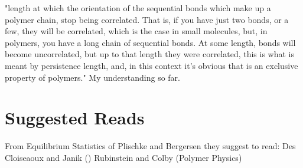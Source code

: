 "length at which the orientation of the sequential bonds which make up
a polymer chain, stop being correlated.  That is, if you have just two
bonds, or a  few, they will be correlated, which is  the case in small
molecules,  but, in  polymers, you  have  a long  chain of  sequential
bonds. At some length, bonds  will become uncorrelated, but up to that
length  they were  correlated, this  is what  is meant  by persistence
length,  and,  in this  context  it's  obvious  that is  an  exclusive
property of polymers." My understanding so far.





\section{Suggested Reads}

From Equilibrium Statistics of Plischke and Bergersen they suggest to
read:
Des Cloiseaoux and Janik ()
Rubinstein and Colby (Polymer Physics)


